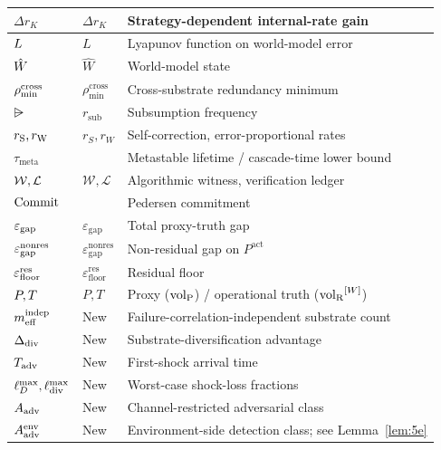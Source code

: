 {\begin{longtable}{@{}p{} p{} p{}@{}}
$\Delta r_K$ & \citep[Horizon Aware]{lasser2026horizon} $\Delta r_K$ & Strategy-dependent internal-rate gain \\
\midrule
$L$ & \citep[Phase Redundancy]{lasser2026phase} $L$ & Lyapunov function on world-model error \\
$\hat{W}$ & \citep[Phase Redundancy]{lasser2026phase} $\hat{W}$ & World-model state \\
$\rho_{\min}^{\mathrm{cross}}$ & \citep[Phase Redundancy]{lasser2026phase} $\rho_{\min}^{\mathrm{cross}}$ & Cross-substrate redundancy minimum \\
$\rsub$ & \citep[Phase Redundancy]{lasser2026phase} $r_{\mathrm{sub}}$ & Subsumption frequency \\
$r_{\mathrm{S}}, r_{\mathrm{W}}$ & \citep[Phase Redundancy]{lasser2026phase} $r_S, r_W$ & Self-correction, error-proportional rates \\
$\tau_{\mathrm{meta}}$ & \citep[Phase Redundancy]{lasser2026phase} & Metastable lifetime / cascade-time lower bound \\
\midrule
$\mathcal{W}, \mathcal{L}$ & \citep[Exogenous Verification]{lasser2026exo} $\mathcal{W}, \mathcal{L}$ & Algorithmic witness, verification ledger \\
$\mathrm{Commit}$ & \citep[Exogenous Verification]{lasser2026exo} & Pedersen commitment \\
\midrule
$\varepsilon_{\mathrm{gap}}$ & \citep[Microfoundation]{lasser2026micro} $\varepsilon_{\mathrm{gap}}$ & Total proxy-truth gap \\
$\varepsilon_{\mathrm{gap}}^{\mathrm{nonres}}$ & \citep[Microfoundation]{lasser2026micro} $\varepsilon_{\mathrm{gap}}^{\mathrm{nonres}}$ & Non-residual gap on $P^{\mathrm{act}}$ \\
$\varepsilon_{\mathrm{floor}}^{\mathrm{res}}$ & \citep[Microfoundation]{lasser2026micro} $\varepsilon_{\mathrm{floor}}^{\mathrm{res}}$ & Residual floor \\
$P, T$ & \citep[Microfoundation]{lasser2026micro} $P, T$ & Proxy (${\operatorname{vol}_{\mathrm{P}}}$) / operational truth (${\operatorname{vol}_{\mathrm{R}}}^{[W]}$) \\
\midrule
$m_{\mathrm{eff}}^{\mathrm{indep}}$ & New & Failure-correlation-independent substrate count \\
$\Delta_{\mathrm{div}}$ & New & Substrate-diversification advantage \\
$T_{\mathrm{adv}}$ & New & First-shock arrival time \\
$\ell_D^{\max}, \ell_{\mathrm{div}}^{\max}$ & New & Worst-case shock-loss fractions \\
$A_{\mathrm{adv}}$ & New & Channel-restricted adversarial class \\
$A_{\mathrm{adv}}^{\mathrm{env}}$ & New & Environment-side detection class; see Lemma~\ref{lem:5e} \\

\end{longtable}}
